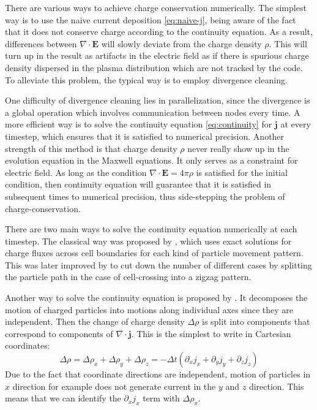 There are various ways to achieve charge conservation numerically. The simplest
way is to use the naive current deposition \eqref{eq:naive-j}, being aware of
the fact that it does not conserve charge according to the continuity equation.
As a result, differences between $\nabla\cdot \mathbf{E}$ will slowly deviate
from the charge density $\rho$. This will turn up in the result as artifacts in
the electric field as if there is spurious charge density dispersed in the
plasma distribution which are not tracked by the code. To alleviate this
problem, the typical way is to employ divergence cleaning. %

One difficulty of divergence cleaning lies in parallelization, since the
divergence is a global operation which involves communication between nodes
every time. A more efficient way is to solve the continuity equation
\eqref{eq:continuity} for $\mathbf{j}$ at every timestep, which ensures that it
is satisfied to numerical precision. Another strength of this method is that
charge density $\rho$ never really show up in the evolution equation in the
Maxwell equations. It only serves as a constraint for electric field. As long as
the condition $\nabla\cdot \mathbf{E} = 4\pi\rho$ is satisfied for the initial
condition, then continuity equation will guarantee that it is satisfied in
subsequent times to numerical precision, thus side-stepping the problem of
charge-conservation.

There are two main ways to solve the continuity equation numerically at each
timestep. The classical way was proposed by \citet{villasenor_rigorous_1992},
which uses exact solutions for charge fluxes across cell boundaries for each
kind of particle movement pattern. This was later improved by
\citet{umeda_new_2003} to cut down the number of different cases by splitting the
particle path in the case of cell-crossing into a zigzag pattern. %

Another way to solve the continuity equation is proposed by
\citet{esirkepov_exact_2001}. It decomposes the motion of charged particles into
motions along individual axes since they are independent. Then the change of
charge density $\Delta\rho$ is split into components that correspond to
components of $\nabla\cdot \mathbf{j}$. This is the simplest to write in
Cartesian coordinates:
\begin{equation}
  \label{eq:esirkepov-split}
  \Delta \rho = \Delta\rho_{x} + \Delta\rho_{y} + \Delta\rho_{z} = -\Delta t(\partial_{x}j_{x} + \partial_{y}j_{y} + \partial_{z}j_{z})
\end{equation}
Due to the fact that coordinate directions are independent, motion of particles
in $x$ direction for example does not generate current in the $y$ and $z$
direction. This means that we can identify the $\partial_{x}j_{x}$ term with
$\Delta \rho_{x}$.

